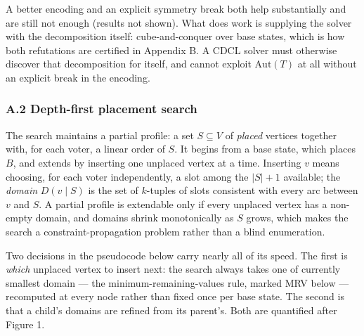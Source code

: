 \documentclass[
]{article}
\begin{document}
A better encoding and an explicit symmetry break both help substantially
and are still not enough (results not shown). What does work is
supplying the solver with the decomposition itself: cube-and-conquer
over base states, which is how both refutations are certified in
Appendix B. A CDCL solver must otherwise discover that decomposition for
itself, and cannot exploit \(\mathrm{Aut}(T)\) at all without an
explicit break in the encoding.

\subsubsection{A.2 Depth-first placement
search}\label{a.2-depth-first-placement-search}

The search maintains a partial profile: a set \(S \subseteq V\) of
\emph{placed} vertices together with, for each voter, a linear order of
\(S\). It begins from a base state, which places \(B\), and extends by
inserting one unplaced vertex at a time. Inserting \(v\) means choosing,
for each voter independently, a slot among the \(|S| + 1\) available;
the \emph{domain} \(D(v \mid S)\) is the set of \(k\)-tuples of slots
consistent with every arc between \(v\) and \(S\). A partial profile is
extendable only if every unplaced vertex has a non-empty domain, and
domains shrink monotonically as \(S\) grows, which makes the search a
constraint-propagation problem rather than a blind enumeration.

Two decisions in the pseudocode below carry nearly all of its speed. The
first is \emph{which} unplaced vertex to insert next: the search always
takes one of currently smallest domain --- the minimum-remaining-values
rule, marked MRV below --- recomputed at every node rather than fixed
once per base state. The second is that a child's domains are refined
from its parent's. Both are quantified after Figure 1.
\end{document}
